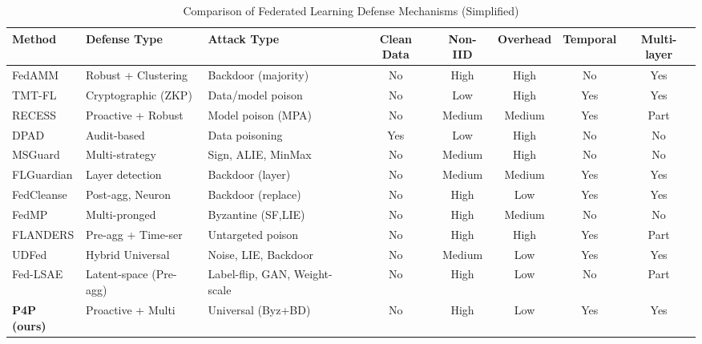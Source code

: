 \begin{table}[ht]
\centering
\caption{Comparison of Federated Learning Defense Mechanisms (Simplified)}
\label{tab:compare}
\small
\begin{tabular}{l l l c c c c c}
\toprule
\textbf{Method} & \textbf{Defense Type} & \textbf{Attack Type} & \textbf{Clean Data} & 
\textbf{Non-IID} & \textbf{Overhead} & \textbf{Temporal} & \textbf{Multi-layer} \\
\midrule
FedAMM \cite{11175562}     & Robust + Clustering & Backdoor (majority) & No  & High   & High   & No  & Yes \\
TMT-FL \cite{lu2025tmtfl}    & Cryptographic (ZKP) & Data/model poison   & No  & Low    & High   & Yes & Yes \\
RECESS \cite{yan2025recess}     & Proactive + Robust  & Model poison (MPA)  & No  & Medium & Medium & Yes & Part \\
DPAD \cite{BASAK2025109893}       & Audit-based         & Data poisoning      & Yes & Low    & High   & No  & No \\
MSGuard \cite{yang2025msguard}    & Multi-strategy      & Sign, ALIE, MinMax  & No  & Medium & High   & No  & No \\
FLGuardian \cite{zhou2025flguardian} & Layer detection     & Backdoor (layer)    & No  & Medium & Medium & Yes & Yes \\
FedCleanse \cite{HUANG2025114494} & Post-agg, Neuron    & Backdoor (replace)  & No  & High   & Low    & Yes & Yes \\
FedMP \cite{ZHAO2025110990}      & Multi-pronged       & Byzantine (SF,LIE)  & No  & High   & Medium & No  & No \\
FLANDERS \cite{11164345}   & Pre-agg + Time-ser  & Untargeted poison   & No  & High   & High   & Yes & Part \\
UDFed \cite{Deng2025UDFedAU}     & Hybrid Universal    & Noise, LIE, Backdoor& No  & Medium & Low    & Yes & Yes \\

Fed-LSAE \cite{FedLSAE} & Latent-space (Pre-agg) & Label-flip, GAN, Weight-scale & No & High & Low & No & Part \\

\textbf{P4P (ours)} & Proactive + Multi & Universal (Byz+BD) & No & High & Low & Yes & Yes \\
\bottomrule
\end{tabular}
\end{table}


 